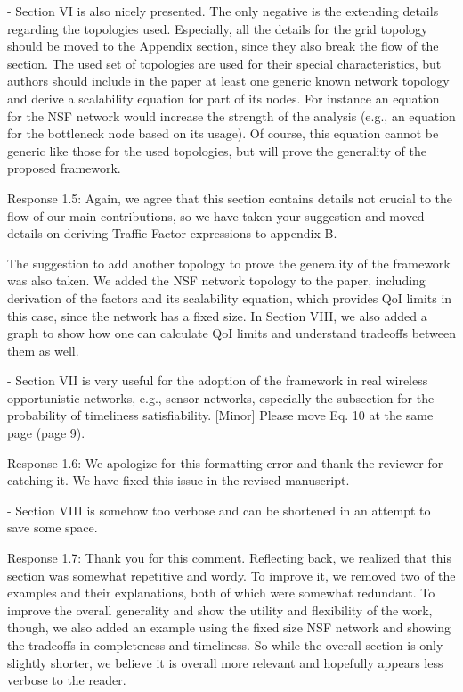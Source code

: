 \documentclass[12pt, letterpaper, onecolumn]{IEEEtran}
\begin{document}
- Section VI is also nicely presented. The only negative is the extending details regarding the topologies used. Especially, all the details for the grid topology should be moved to the Appendix section, since they also break the flow of the section. The used set of topologies are used for their special characteristics, but authors should include in the paper at least one generic known network topology and derive a scalability equation for part of its nodes. For instance an equation for the NSF network would increase the strength of the analysis (e.g., an equation for the bottleneck node based on its usage). Of course, this equation cannot be generic like those for the used topologies, but will prove the generality of the proposed framework.

{\color {blue}
Response 1.5: Again, we agree that this section contains details not crucial to the flow of our main contributions, so we have taken your suggestion and moved details on deriving Traffic Factor expressions to appendix B. 

The suggestion to add another topology to prove the generality of the framework was also taken. We added the NSF network topology to the paper, including derivation of the factors and its scalability equation, which provides QoI limits in this case, since the network has a fixed size. In Section VIII, we also added a graph to show how one can calculate QoI limits and understand tradeoffs between them as well.  
}

- Section VII is very useful for the adoption of the framework in real wireless opportunistic networks, e.g., sensor networks, especially the subsection for the probability of timeliness satisfiability. [Minor] Please move Eq. 10 at the same page (page 9).

{\color {blue}
Response 1.6: We apologize for this formatting error and thank the reviewer for catching it. We have fixed this issue in the revised manuscript.
}

- Section VIII is somehow too verbose and can be shortened in an attempt to save some space.

{\color {blue}
Response 1.7: Thank you for this comment. Reflecting back, we realized that this section was somewhat repetitive and wordy. To improve it, we removed two of the examples and their explanations, both of which were somewhat redundant. To improve the overall generality and show the utility and flexibility of the work, though, we also added an example using the fixed size NSF network and showing the tradeoffs in completeness and timeliness. So while the overall section is only slightly shorter, we believe it is overall more relevant and hopefully appears less verbose to the reader.
}
\end{document}
